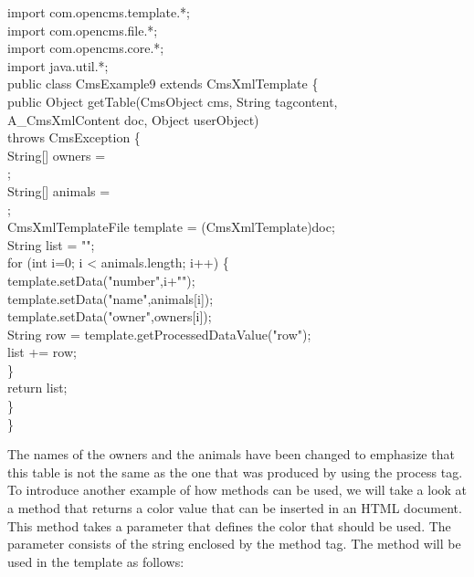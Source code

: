 \begin{java} 
import com.opencms.template.*;\\

import com.opencms.file.*;\\

import com.opencms.core.*;\\

import java.util.*;\\
public class CmsExample9 extends CmsXmlTemplate \{\\
\jtabb   public Object getTable(CmsObject cms, String tagcontent,\\
\jtabe           A\_CmsXmlContent doc, Object userObject)\\
\jtabe           throws CmsException \{\\
\jtabb   String[] owners =\\
;\\
\jtabb   String[] animals =\\
;\\
\jtabb   CmsXmlTemplateFile template = (CmsXmlTemplate)doc;\\
\jtabb   String list = "";\\
\jtabb   for (int i=0; i < animals.length;  i++) \{\\
\jtabd        template.setData("number",i+"");\\
\jtabd        template.setData("name",animals[i]);\\
\jtabd        template.setData("owner",owners[i]);\\
\jtabd        String row = template.getProcessedDataValue("row");\\
\jtabe           list += row;\\
\jtabb   \}\\
\jtabb   return list;\\
\jtabb   \}\\

\}\\
\end{java}

The names of the owners and the animals have been changed to emphasize
that this table is not the same as the one that was produced by using
the process tag.
To introduce another example of how methods can be used, we will take a
look at a method that returns a color value that can be inserted in an
HTML document. This method takes a parameter that defines the color
that should be used. The parameter consists of the string enclosed by
the method tag. The method will be used in the template as follows:

